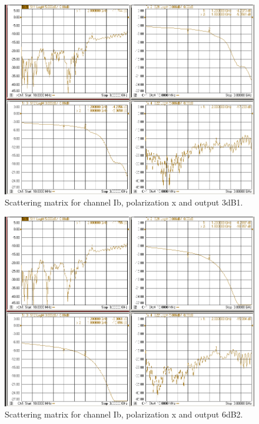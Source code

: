 \documentclass[12pt,a4paper,oneside]{article}
\begin{document}
\begin{figure}[H]
\centering
\includegraphics[width=0.9\linewidth]{VNA_results/Ibx_3dB1.png}
\caption{Scattering matrix for channel Ib, polarization x and output 3dB1.}
\label{fig:Ibx_3dB1}
\end{figure}


\begin{figure}[H]
\centering
\includegraphics[width=0.9\linewidth]{VNA_results/Ibx_6dB2.png}
\caption{Scattering matrix for channel Ib, polarization x and output 6dB2.}
\label{fig:Ibx_6dB2}
\end{figure}
\end{document}

